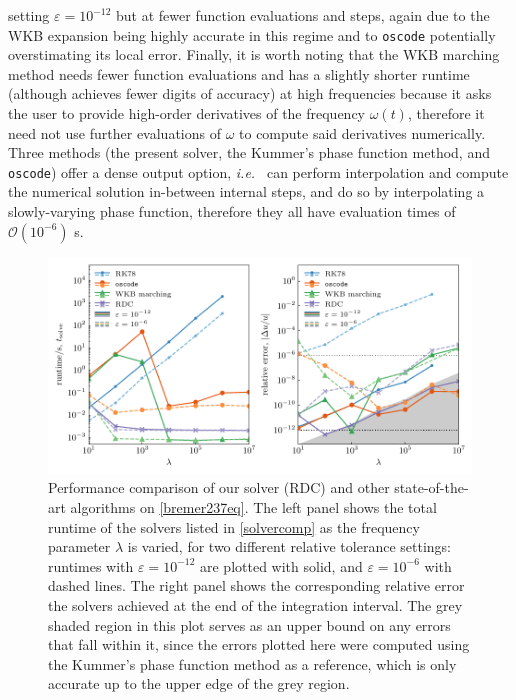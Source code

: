 \documentclass[10pt]{article}
\newcommand{\ie}{{\it i.e.\ }}
\newcommand{\om}{\omega}
\begin{document}
setting $\varepsilon = 10^{-12}$ but at fewer function evaluations and steps,
again due to the WKB expansion being highly accurate in this regime and to
\texttt{oscode} potentially overstimating its local error. Finally, it is worth
noting that the WKB marching method needs fewer function evaluations and has a
slightly shorter runtime (although achieves fewer digits of accuracy) at high
frequencies because it asks the user to provide high-order derivatives of the
frequency $\om(t)$, therefore it need not use further evaluations of $\om$ to
compute said derivatives numerically. Three methods (the present solver, the
Kummer's phase function method, and \texttt{oscode}) offer a dense output option, \ie
can perform interpolation and compute the numerical solution in-between
internal steps, and do so by interpolating a slowly-varying phase function,
therefore they all have evaluation times of $\mathcal{O}(10^{-6})$ \si{\s}.  

\begin{figure}[tb]
    \centering
    \includegraphics{plots/bremer237-timing.pdf}
    \caption{\label{bremer237-timing} Performance comparison of our solver (RDC) and
    other state-of-the-art algorithms on \cref{bremer237eq}. The left panel
    shows the total runtime of the solvers listed in \cref{solvercomp} as the
    frequency parameter $\lambda$ is varied, for two different relative
    tolerance settings: runtimes with $\varepsilon = 10^{-12}$ are plotted with
    solid, and $\varepsilon = 10^{-6}$ with dashed lines. The right panel shows
    the corresponding relative error the solvers achieved at the end of the
    integration interval. The grey shaded region in this plot serves as an
    upper bound on any errors that fall within it, since the errors plotted
    here were computed using the Kummer's phase function method as a reference, which is
    only accurate up to the upper edge of the grey region.}
\end{figure}
\end{document}
